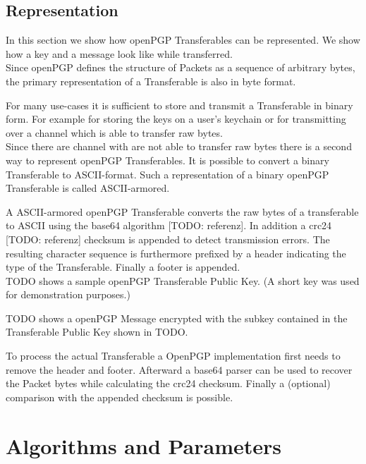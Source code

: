 \subsection{Representation}

In this section we show how openPGP Transferables can be represented. We show how a key and a message look like while transferred. \\

Since openPGP defines the structure of Packets as a sequence of arbitrary bytes, the primary representation of a Transferable is also in byte format.

For many use-cases it is sufficient to store and transmit a Transferable in binary form. For example for storing the keys on a user's keychain or for transmitting over a channel which is able to transfer raw bytes. \\


Since there are channel with are not able to transfer raw bytes there is a second way to represent openPGP Transferables. It is possible to convert a binary Transferable to ASCII-format. Such a representation of a binary openPGP Transferable is called ASCII-armored.

A ASCII-armored openPGP Transferable converts the raw bytes of a transferable to ASCII using the base64 algorithm [TODO: referenz]. In addition a crc24 [TODO: referenz] checksum is appended to detect transmission errors. The resulting character sequence is furthermore prefixed by a header indicating the type of the Transferable. Finally a footer is appended. \\

TODO shows a sample openPGP Transferable Public Key. (A short key was used for demonstration purposes.)

TODO shows a openPGP Message encrypted with the subkey contained in the Transferable Public Key shown in TODO.


To process the actual Transferable a OpenPGP implementation first needs to remove the header and footer. Afterward a base64 parser can be used to recover the Packet bytes while calculating the crc24 checksum. Finally a (optional) comparison with the appended checksum is possible.



\section{Algorithms and Parameters}

